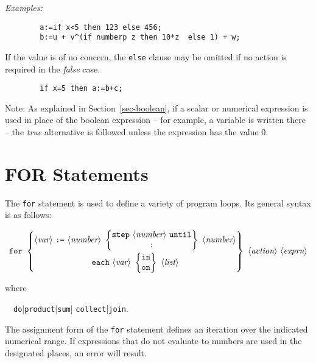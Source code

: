 \textit{Examples:}
\begin{verbatim}
        a:=if x<5 then 123 else 456;
        b:=u + v^(if numberp z then 10*z  else 1) + w;
\end{verbatim}
If the value is of no concern, the \texttt{else} clause may be omitted if no
action is required in the \emph{false} case.
\begin{verbatim}
        if x=5 then a:=b+c;
\end{verbatim}
Note:  As explained in Section~\ref{sec-boolean},
if a scalar or numerical expression is used in place of
the boolean expression -- for example, a variable is written there -- the
\emph{true} alternative is followed unless the expression has the value 0.

\section{FOR Statements}
\hypertarget{command:FOR}{}
\hypertarget{command:FOREACH}{}
\hypertarget{reserved:IN}{}
\hypertarget{reserved:DO}{}
\hypertarget{reserved:SUM}{}
\hypertarget{reserved:PRODUCT}{}

The \texttt{for} statement
is used to define a variety of program
loops.  Its general syntax is as follows:
\begin{small}
  \[ \texttt{for}\ \left\{
  \begin{array}{@{}c@{}}
    \langle\textit{var}\rangle\ \texttt{:=}\ \langle\textit{number}\rangle\
    \left\{
    \begin{array}{@{}c@{}}
      \texttt{step}\ \langle\textit{number}\rangle\ \texttt{until} \\
      \texttt{:}
    \end{array}
    \right\}\
    \langle\textit{number}\rangle \\[3mm]
    \texttt{each}\ \langle\textit{var}\rangle\
    \left\{
    \begin{array}{@{}c@{}}
      \texttt{in} \\ \texttt{on}
    \end{array}
    \right\}\
    \langle\textit{list}\rangle
  \end{array}
  \right\}\ \langle\textit{action}\rangle\ \langle\textit{exprn}\rangle \]
\end{small}%
%
where
\begin{syntax}
  \ \BNFprod\ \texttt{do}|\texttt{product}|\texttt{sum}|%
                           \texttt{collect}|\texttt{join}.
\end{syntax}
The assignment form of the \texttt{for} statement defines an
iteration over the indicated numerical range.  If expressions that do not
evaluate to numbers are used in the designated places, an error will
result.

